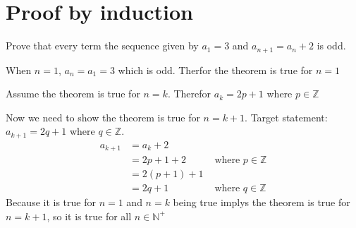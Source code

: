 
\chapter{Proof by induction}

\begin{example}
    Prove that every term the sequence given by $a_1=3$ and $a_{n+1}=a_n+2$
    is odd. 
    \par\noindent\hrulefill\par\par 
    When $n=1$, $a_n=a_1=3$ which is odd. Therfor the theorem is true for $n=1$
    \par
    Assume the theorem is true for $n=k$. Therefor $a_k=2p+1$ where $p\in\mathbb{Z}$
    \par
    Now we need to show the theorem is true for $n=k+1$. 
    Target statement: $a_{k+1}=2q+1$ where $q\in\mathbb{Z}$.
    \begin{align*}
        a_{k+1}&=a_k+2\\
        &=2p+1+2 &\text{ where } p\in\mathbb{Z}\\
        &= 2(p+1)+1 \\
        &= 2q+1 &\text{ where } q\in\mathbb{Z}
    \end{align*}
    Because it is true for $n=1$ and $n=k$ being true implys the theorem is 
    true for $n=k+1$, so it is true for all $n\in\mathbb{N}^+$
\end{example}
\begin{example}
    
\end{example}

